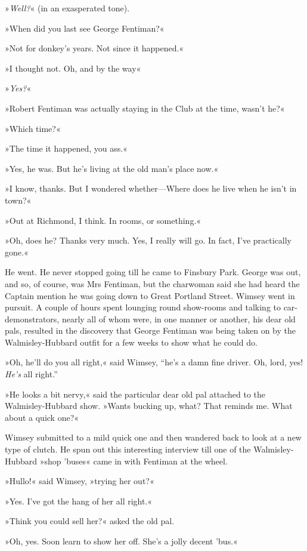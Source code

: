 »\textit{Well?}« (in an exasperated tone).

»When did you last see George Fentiman?«

»Not for donkey's years. Not since it happened.«

»I thought not. Oh, and by the way\longdash«

»\textit{Yes?}«

»Robert Fentiman was actually staying in the Club at the time, wasn't he?«

»Which time?«

»The time it happened, you ass.«

»Yes, he was. But he's living at the old man's place now.«

»I know, thanks. But I wondered whether\allowbreak---\allowbreak Where does he live when he isn't in town?«

»Out at Richmond, I think. In rooms, or something.«

»Oh, does he? Thanks very much. Yes, I really will go. In fact, I've practically gone.«

He went. He never stopped going till he came to Finsbury Park. George was out, and so, of course, was Mrs Fentiman, but the charwoman said she had heard the Captain mention he was going down to Great Portland Street. Wimsey went in pursuit. A couple of hours spent lounging round show-rooms and talking to car-demonstrators, nearly all of whom were, in one manner or another, his dear old pals, resulted in the discovery that George Fentiman was being taken on by the Walmisley-Hubbard outfit for a few weeks to show what he could do.

»Oh, he'll do you all right,« said Wimsey, \enquote{he's a damn fine driver. Oh, lord, yes! \textit{He's} all right.}

»He looks a bit nervy,« said the particular dear old pal attached to the Walmisley-Hubbard show. »Wants bucking up, what? That reminds me. What about a quick one?«

Wimsey submitted to a mild quick one and then wandered back to look at a new type of clutch. He spun out this interesting interview till one of the Walmisley-Hubbard »shop 'buses« came in with Fentiman at the wheel.

»Hullo!« said Wimsey, »trying her out?«

»Yes. I've got the hang of her all right.«

»Think you could sell her?« asked the old pal.

»Oh, yes. Soon learn to show her off. She's a jolly decent 'bus.«

